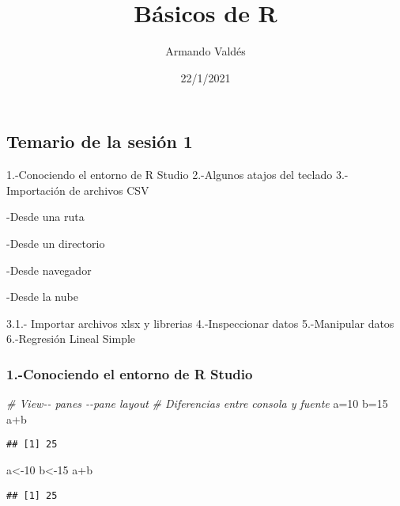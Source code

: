 \documentclass[
]{article}
\title{Básicos de R}
\author{Armando Valdés}
\date{22/1/2021}
\newenvironment{Shaded}{\begin{snugshade}}{\end{snugshade}}
\newcommand{\CommentTok}[1]{\textcolor[rgb]{0.56,0.35,0.01}{\textit{#1}}}
\newcommand{\DecValTok}[1]{\textcolor[rgb]{0.00,0.00,0.81}{#1}}
\newcommand{\NormalTok}[1]{#1}
\newcommand{\OtherTok}[1]{\textcolor[rgb]{0.56,0.35,0.01}{#1}}
\newcommand{\SpecialCharTok}[1]{\textcolor[rgb]{0.00,0.00,0.00}{#1}}
\begin{document}
\maketitle

\hypertarget{temario-de-la-sesiuxf3n-1}{%
\subsection{Temario de la sesión 1}\label{temario-de-la-sesiuxf3n-1}}

1.-Conociendo el entorno de R Studio 2.-Algunos atajos del teclado
3.-Importación de archivos CSV

-Desde una ruta

-Desde un directorio

-Desde navegador

-Desde la nube

3.1.- Importar archivos xlsx y librerias 4.-Inspeccionar datos
5.-Manipular datos 6.-Regresión Lineal Simple

\hypertarget{conociendo-el-entorno-de-r-studio}{%
\subsubsection{\texorpdfstring{1.-Conociendo el entorno de R Studio
}{1.-Conociendo el entorno de R Studio  }}\label{conociendo-el-entorno-de-r-studio}}

\begin{Shaded}
\begin{Highlighting}[]
\CommentTok{\# View{-}{-} panes {-}{-}pane layout}
\CommentTok{\# Diferencias entre consola y fuente}
\NormalTok{a}\OtherTok{=}\DecValTok{10}
\NormalTok{b}\OtherTok{=}\DecValTok{15}
\NormalTok{a}\SpecialCharTok{+}\NormalTok{b}
\end{Highlighting}
\end{Shaded}

\begin{verbatim}
## [1] 25
\end{verbatim}

\begin{Shaded}
\begin{Highlighting}[]
\NormalTok{a}\OtherTok{\textless{}{-}}\DecValTok{10}
\NormalTok{b}\OtherTok{\textless{}{-}}\DecValTok{15}
\NormalTok{a}\SpecialCharTok{+}\NormalTok{b}
\end{Highlighting}
\end{Shaded}

\begin{verbatim}
## [1] 25
\end{verbatim}
\end{document}
